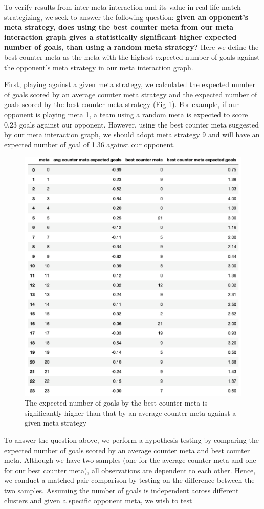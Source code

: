 \documentclass{article}
\begin{document}
To verify results from inter-meta interaction and its value in real-life match strategizing, we seek to answer the following question: \textbf{given an opponent's meta strategy, does using the best counter meta from our meta interaction graph gives a statistically significant higher expected number of goals, than using a random meta strategy?} Here we define the best counter meta as the meta with the highest expected number of goals against the opponent's meta strategy in our meta interaction graph.

First, playing against a given meta strategy, we calculated the expected number of goals scored by an average counter meta strategy and the expected number of goals scored by the best counter meta strategy (Fig \ref{fig:countermeta}). For example, if our opponent is playing meta 1, a team using a random meta is expected to score 0.23 goals against our opponent. However, using the best counter meta suggested by our meta interaction graph, we should adopt meta strategy 9 and will have an expected number of goal of 1.36 against our opponent.

\begin{figure}[H]
\centering
\includegraphics[width=.7\textwidth]{countermeta.png}
\caption{The expected number of goals by the best counter meta is significantly higher than that by an average counter meta against a given meta strategy}
\label{fig:countermeta}
\end{figure}

To answer the question above, we perform a hypothesis testing by comparing the expected number of goals scored by an average counter meta and best counter meta. Although we have two samples (one for the average counter meta and one for our best counter meta), all observations are dependent to each other. Hence, we conduct a matched pair comparison by testing on the difference between the two samples. Assuming the number of goals is independent across different clusters and given a specific opponent meta, we wish to test
\end{document}
